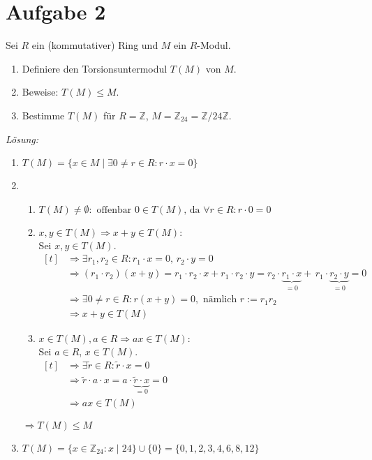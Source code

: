 \documentclass[]{scrartcl}
\newcommand{\Z}{\mathbb{Z}}
\newcommand{\<}{\trianglelefteq}
\begin{document}
\section*{Aufgabe 2}
Sei $R$ ein (kommutativer) Ring und $M$ ein $R$-Modul.
\begin{enumerate}[label=(\alph*)]
	\item Definiere den Torsionsuntermodul $T(M)$ von $M$.
	\item Beweise: $T(M) \leq M$.
	\item Bestimme $T(M)$ für $R = \Z$, $M=\Z_{24}=\Z/24\Z$.
\end{enumerate}
\textit{Lösung:}
\begin{enumerate}[label=zu (\alph*):]
	\item $T(M)=\{x \in M \mid \exists 0 \ne r \in R \colon r\cdot x=0\}$
	\item
		\begin{enumerate}[label=(\roman*)]
			\item $T(M)\ne \emptyset : \text{ offenbar } 0 \in T(M) \text{, da } \forall r\in R\colon r\cdot 0 =0$
			\item $x,y\in T(M) \Rightarrow x+y\in T(M):$\\
				Sei $x,y\in T(M).$\\
				$\begin{aligned}[t]
					&\Rightarrow \exists r_1,r_2\in R\colon r_1\cdot x=0,\, r_2\cdot y=0 \\
					&\Rightarrow (r_1\cdot r_2)(x+y)=r_1\cdot r_2\cdot x+r_1\cdot r_2\cdot y=r_2\cdot \underbrace{r_1\cdot x}_{=0} +\, r_1\cdot \underbrace{r_2\cdot y}_{=0}=0 \\
					&\Rightarrow \exists 0\ne r\in R: r(x+y)=0, \text{ nämlich } r:=r_1r_2 \\
					&\Rightarrow x+y\in T(M)
				\end{aligned}$
			\item $x\in T(M), a \in R \Rightarrow ax \in T(M):$\\
				Sei $a\in R$, $x\in T(M)$.\\
				$\begin{aligned}[t]
					&\Rightarrow \exists \tilde{r}\in R\colon \tilde{r}\cdot x=0 \\
					&\Rightarrow \tilde{r}\cdot a\cdot x=a\cdot \underbrace{\tilde{r}\cdot x}_{=0}=0 \\
					&\Rightarrow ax\in T(M)
				\end{aligned}$
		\end{enumerate}
	$\Rightarrow T(M) \leq M$
	\item $T(M)=\{x\in \Z_{24}\colon x\mid 24\}\cup\{0\}=\{0,1,2,3,4,6,8,12\}$
\end{enumerate}
\pagebreak
\end{document}
